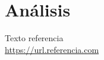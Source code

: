 \documentclass[11pt,a4paper]{article}
\begin{document}
\newpage

\section{Análisis}

\newpage

\begin{thebibliography}{5}

Texto referencia
\\\url{https://url.referencia.com}

\end{thebibliography}
\end{document}
